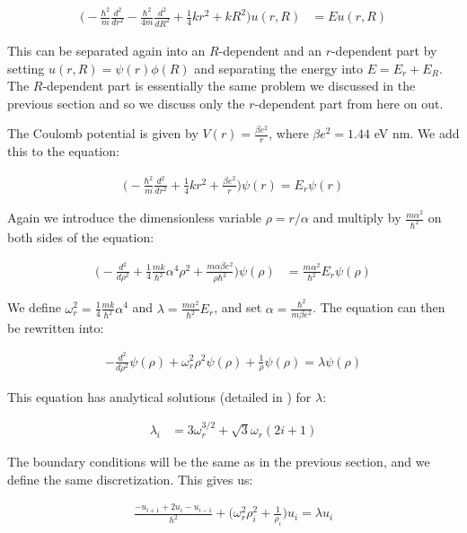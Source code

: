 \documentclass[reprint,english,notitlepage]{revtex4-1}  %
\begin{document}
\begin{align*}
\bigg( -\frac{\hbar^2}{m} \frac{d^2}{dr^2} - \frac{\hbar^2}{4m} \frac{d^2}{dR^2} + \frac{1}{4}kr^2 + kR^2\bigg) u(r,R) &= Eu(r,R)
\end{align*}

This can be separated again into an $R$-dependent and an $r$-dependent part by setting $u(r,R) = \psi(r) \phi(R)$ and separating the energy into $E = E_r + E_R$. The $R$-dependent part is essentially the same problem we discussed in the previous section and so we discuss only the $r$-dependent part from here on out.

The Coulomb potential is given by $V(r) = \frac{\beta e^2}{r}$, where $\beta e^2 = 1.44$ eV nm. We add this to the equation:

\begin{align*}
\bigg( - \frac{\hbar^2}{m} \frac{d^2}{dr^2} + \frac{1}{4}kr^2 + \frac{\beta e^2}{r} \bigg) \psi(r) = E_r \psi(r)
\end{align*}

Again we introduce the dimensionless variable $\rho = r/\alpha$ and multiply by $\frac{m\alpha^2}{\hbar^2}$ on both sides of the equation:

\begin{align*}
\bigg( - \frac{d^2}{d\rho^2} + \frac{1}{4} \frac{mk}{\hbar^2} \alpha^4 \rho^2 + \frac{m\alpha \beta e^2}{\rho \hbar^2} \bigg) \psi (\rho) &= \frac{m\alpha^2}{\hbar^2} E_r \psi(\rho)
\end{align*}

We define $\omega_r^2 = \frac{1}{4} \frac{mk}{\hbar^2} \alpha^4$ and $\lambda = \frac{m\alpha^2}{\hbar^2}E_r$, and set $\alpha = \frac{\hbar^2}{m\beta e^2}$. The equation can then be rewritten into:

\begin{align*}
- \frac{d^2}{d\rho^2} \psi(\rho) + \omega_r^2 \rho^2 \psi(\rho) + \frac{1}{\rho} \psi(\rho) = \lambda \psi(\rho)
\end{align*}

This equation has analytical solutions (detailed in \citep{PhysRevA.48.3561}) for $\lambda$:

\begin{align*}
\lambda_i &= 3 \omega_r^{3/2} +\sqrt{3} \omega_r (2i + 1)
\end{align*}

The boundary conditions will be the same as in the previous section, and we define the same discretization. This gives us:

\begin{align*}
\frac{-u_{i+1} + 2u_i - u_{i-1}}{h^2} + \bigg( \omega_r^2\rho_i^2 + \frac{1}{\rho_i} \bigg) u_i = \lambda u_i
\end{align*}
\end{document}
